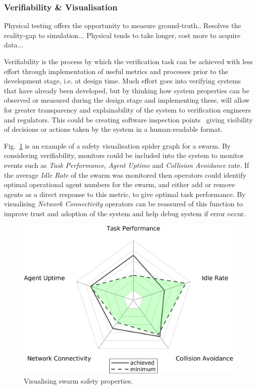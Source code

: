 \documentclass[lettersize,journal]{IEEEtran}
\begin{document}
\subsubsection{Verifiability \& Visualisation}

Physical testing offers the opportunity to measure ground-truth..
Resolves the reality-gap to simulation...
Physical tends to take longer, cost more to acquire data...

Verifiability is the process by which the verification task can be achieved with less effort through implementation of useful metrics and processes prior to the  development stage, i.e. at design time. Much effort goes into verifying systems that have already been developed, but by thinking how system properties can be observed or measured during the design stage and implementing these, will allow for greater transparency and explainability of the system to verification engineers and regulators. This could be creating software inspection points~\cite{koopman2018toward} giving visibility of decisions or actions taken by the system in a human-readable format. 

Fig.~\ref{swarm_trust_spider} is an example of a safety visualisation spider graph for a swarm. By considering verifiability, monitors could be included into the system to monitor events such as \emph{Task Performance}, \emph{Agent Uptime} and \emph{Collision Avoidance} rate. If the average \emph{Idle Rate} of the swarm was monitored then operators could identify optimal operational agent numbers for the swarm, and either add or remove agents as a direct response to this metric, to give optimal task performance. By visualising \emph{Network Connectivity} operators can be reassured of this function to improve trust and adoption of the system and help debug system if error occur. 

\begin{figure}
	\centering
	\includegraphics[width=1.0\textwidth]{figures/swarm_trust_spider.png}
	\caption{Visualising swarm safety properties.}
	\label{swarm_trust_spider}
\end{figure}
\end{document}
